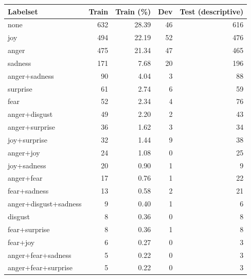 \begin{tabular}{lrrrr}
\toprule
Labelset & Train & Train (\%) & Dev & Test (descriptive) \\
\midrule
none & 632 & 28.39 & 46 & 616 \\
joy & 494 & 22.19 & 52 & 476 \\
anger & 475 & 21.34 & 47 & 465 \\
sadness & 171 & 7.68 & 20 & 196 \\
anger+sadness & 90 & 4.04 & 3 & 88 \\
surprise & 61 & 2.74 & 6 & 59 \\
fear & 52 & 2.34 & 4 & 76 \\
anger+disgust & 49 & 2.20 & 2 & 43 \\
anger+surprise & 36 & 1.62 & 3 & 34 \\
joy+surprise & 32 & 1.44 & 9 & 38 \\
anger+joy & 24 & 1.08 & 0 & 25 \\
joy+sadness & 20 & 0.90 & 1 & 9 \\
anger+fear & 17 & 0.76 & 1 & 22 \\
fear+sadness & 13 & 0.58 & 2 & 21 \\
anger+disgust+sadness & 9 & 0.40 & 1 & 6 \\
disgust & 8 & 0.36 & 0 & 8 \\
fear+surprise & 8 & 0.36 & 1 & 8 \\
fear+joy & 6 & 0.27 & 0 & 3 \\
anger+fear+sadness & 5 & 0.22 & 0 & 3 \\
anger+fear+surprise & 5 & 0.22 & 0 & 3 \\
\bottomrule
\end{tabular}

